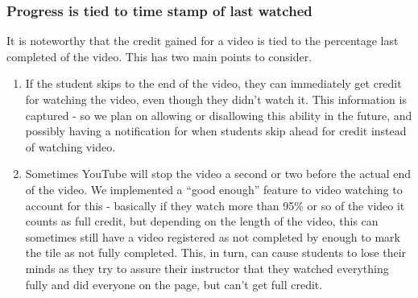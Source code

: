 \documentclass{ximera}
\begin{document}
    \subsubsection*{Progress is tied to time stamp of last watched}
        It is noteworthy that the credit gained for a video is tied to the percentage last completed of the video. This has two main points to consider.
        \begin{enumerate}
            \item If the student skips to the end of the video, they can immediately get credit for watching the video, even though they didn't watch it. This information is captured - so we plan on allowing or disallowing this ability in the future, and possibly having a notification for when students skip ahead for credit instead of watching video.
            \item Sometimes YouTube will stop the video a second or two before the actual end of the video. We implemented a ``good enough'' feature to video watching to account for this - basically if they watch more than 95\% or so of the video it counts as full credit, but depending on the length of the video, this can sometimes still have a video registered as not completed by enough to mark the tile as not fully completed. This, in turn, can cause students to lose their minds as they try to assure their instructor that they watched everything fully and did everyone on the page, but can't get full credit.
        
        \end{enumerate}
\end{document}
